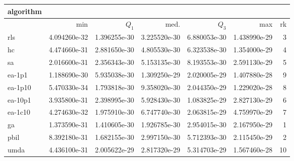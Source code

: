 \begin{tabular}{@{}l*{5}{>{{}}N{1}{1}}>{{}}N{2}{0}@{}}
\toprule
{algorithm} &  \\
\midrule
& {min} & {$Q_1$} & {med.} & {$Q_3$} & {max} & {rk}\\
\midrule
rls & 4.094260e-32 & {\color{blue}} 1.396255e-30 & 3.225520e-30 & 6.880053e-30 & 1.438990e-29 & 3\\
hc & 4.474660e-31 & 2.881650e-30 & 4.805530e-30 & 6.323538e-30 & {\color{blue}} 1.354000e-29 & 4\\
sa & 2.016600e-31 & 2.356343e-30 & 5.153135e-30 & 8.193553e-30 & 2.591130e-29 & 5\\
ea-1p1 & 1.188690e-30 & 5.935038e-30 & 1.309250e-29 & 2.020005e-29 & 1.407880e-28 & 9\\
ea-1p10 & {\color{blue}} 5.470330e-34 & 1.793818e-30 & 9.358020e-30 & 2.044350e-29 & 1.229020e-28 & 8\\
ea-10p1 & 3.935800e-31 & 2.398995e-30 & 5.928430e-30 & 1.083825e-29 & 2.827130e-29 & 6\\
ea-1c10 & 4.274630e-32 & 1.975910e-30 & 6.747740e-30 & 2.063815e-29 & 4.759970e-29 & 7\\
ga & 1.373590e-31 & 1.410605e-30 & {\color{blue}} 1.926785e-30 & {\color{blue}} 2.954015e-30 & 2.167950e-29 & 1\\
pbil & 8.392180e-31 & 1.682155e-30 & 2.997150e-30 & 5.712393e-30 & 2.115450e-29 & 2\\
umda & 4.436100e-31 & 2.005622e-29 & 2.817320e-29 & 5.314703e-29 & 1.567460e-28 & 10\\
\bottomrule
\end{tabular}
